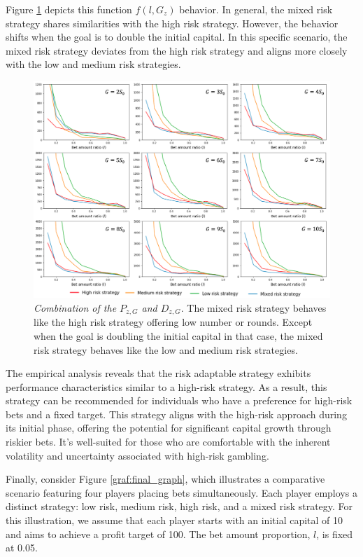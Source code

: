 \documentclass[11pt,twoside]{article}
\numberwithin{Theorem}{section}
\numberwithin{Definition}{section}
\numberwithin{Lemma}{section}
\numberwithin{Algorithm}{section}
\numberwithin{equation}{section}
\begin{document}
Figure \ref{graf:function} depicts this function $f(l, G_z)$ behavior. In general, the mixed risk strategy shares similarities with the high risk strategy. However, the behavior shifts when the goal is to double the initial capital. In this specific scenario, the mixed risk strategy deviates from the high risk strategy and aligns more closely with the low and medium risk strategies.
\begin{figure}[H]
        \centering
        \includegraphics[width=16cm]{result_f.png}
        \caption[Combination of the $P_{z,G}$ and $D_{z,G}$]{\textit{Combination of the $P_{z,G}$ and $D_{z,G}$}.  The mixed risk strategy behaves like the high risk strategy offering low number or rounds. Except when the goal is doubling the initial capital in that case, the mixed risk strategy behaves like the low and medium risk strategies.}\label{graf:function}
\end{figure}

The empirical analysis reveals that the risk adaptable strategy exhibits performance characteristics similar to a high-risk strategy. As a result, this strategy can be recommended for individuals who have a preference for high-risk bets and a fixed target. This strategy aligns with the high-risk approach during its initial phase, offering the potential for significant capital growth through riskier bets. It's well-suited for those who are comfortable with the inherent volatility and uncertainty associated with high-risk gambling.

Finally, consider Figure \ref{graf:final_graph}, which illustrates a comparative scenario featuring four players  placing bets simultaneously. Each player employs a distinct strategy: low risk, medium risk, high risk, and a mixed risk strategy. For this illustration, we assume that each player starts with an initial capital of 10 and aims to achieve a profit target of 100. The bet amount proportion, $l$, is fixed at 0.05.
\end{document}
